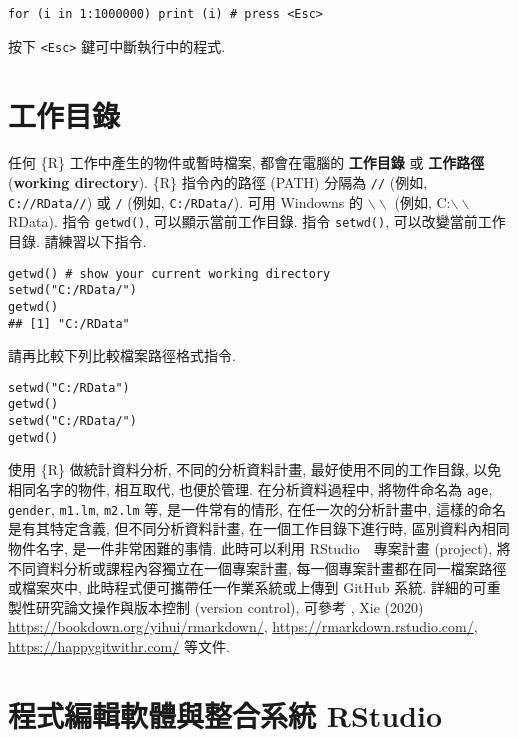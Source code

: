 \documentclass[
]{book}
\begin{document}
\begin{verbatim}
for (i in 1:1000000) print (i) # press <Esc>
\end{verbatim}

按下 \texttt{\textless{}Esc\textgreater{}} 鍵可中斷執行中的程式.

\hypertarget{ux5de5ux4f5cux76eeux9304}{%
\section{工作目錄}\label{ux5de5ux4f5cux76eeux9304}}

任何 \{R\} 工作中產生的物件或暫時檔案,
都會在電腦的
\textbf{工作目錄}
或
\textbf{工作路徑}
(\textbf{working directory}).
\{R\} 指令內的路徑 (PATH) 分隔為 \texttt{//} (例如, \texttt{C://RData//})
或 \texttt{/} (例如, \texttt{C:/RData/}).
可用 Windowns 的 \(\backslash\backslash\) (例如, C:\(\backslash\backslash\)RData).
指令 \texttt{getwd()},
可以顯示當前工作目錄.
指令
\texttt{setwd()},
可以改變當前工作目錄.
請練習以下指令.

\begin{verbatim}
getwd() # show your current working directory
setwd("C:/RData/")
getwd()
## [1] "C:/RData"
\end{verbatim}

請再比較下列比較檔案路徑格式指令.

\begin{verbatim}
setwd("C:/RData")
getwd()
setwd("C:/RData/")
getwd()
\end{verbatim}

使用 \{R\} 做統計資料分析,
不同的分析資料計畫,
最好使用不同的工作目錄,
以免相同名字的物件, 相互取代,
也便於管理.
在分析資料過程中,
將物件命名為 \texttt{age}, \texttt{gender},
\texttt{m1.lm}, \texttt{m2.lm} 等,
是一件常有的情形,
在任一次的分析計畫中,
這樣的命名是有其特定含義,
但不同分析資料計畫,
在一個工作目錄下進行時,
區別資料內相同物件名字,
是一件非常困難的事情.
此時可以利用 RStudio　專案計畫 (project),
將不同資料分析或課程內容獨立在一個專案計畫,
每一個專案計畫都在同一檔案路徑或檔案夾中,
此時程式便可攜帶任一作業系統或上傳到 GitHub 系統.
詳細的可重製性研究論文操作與版本控制 (version control),
可參考 \citep{xie2015}, Xie (2020) \url{https://bookdown.org/yihui/rmarkdown/},
\url{https://rmarkdown.rstudio.com/},
\url{https://happygitwithr.com/} 等文件.

\hypertarget{ux7a0bux5f0fux7de8ux8f2fux8edfux9ad4ux8207ux6574ux5408ux7cfbux7d71-rstudio}{%
\section{程式編輯軟體與整合系統 RStudio}\label{ux7a0bux5f0fux7de8ux8f2fux8edfux9ad4ux8207ux6574ux5408ux7cfbux7d71-rstudio}}
\end{document}
